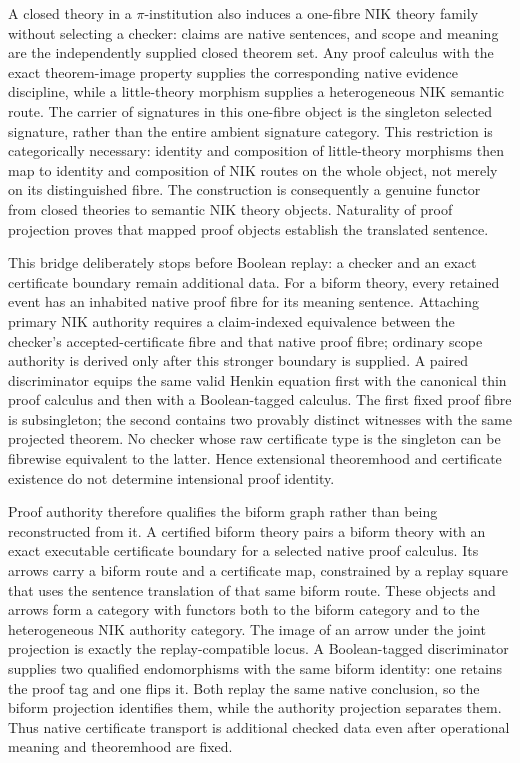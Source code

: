 \documentclass[11pt]{article}
\theoremstyle{definition}
\theoremstyle{remark}
\begin{document}
A closed theory in a $\pi$-institution also induces a one-fibre NIK theory
family without selecting a checker: claims are native sentences, and scope and
meaning are the independently supplied closed theorem set.  Any proof calculus
with the exact theorem-image property supplies the corresponding native
evidence discipline, while a little-theory morphism supplies a heterogeneous
NIK semantic route.  The carrier of signatures in this one-fibre object is the
singleton selected signature, rather than the entire ambient signature
category.  This restriction is categorically necessary: identity and
composition of little-theory morphisms then map to identity and composition of
NIK routes on the whole object, not merely on its distinguished fibre.  The
construction is consequently a genuine functor from closed theories to
semantic NIK theory objects.  Naturality of proof projection proves that mapped
proof objects establish the translated sentence.

This bridge deliberately stops before Boolean replay: a checker and an exact
certificate boundary remain additional data.  For a biform theory, every
retained event has an inhabited native proof fibre for its meaning sentence.
Attaching primary NIK authority requires a claim-indexed equivalence between
the checker's accepted-certificate fibre and that native proof fibre; ordinary
scope authority is derived only after this stronger boundary is supplied.  A
paired discriminator equips the same valid Henkin equation first with the
canonical thin proof calculus and then with a Boolean-tagged calculus.  The
first fixed proof fibre is subsingleton; the second contains two provably
distinct witnesses with the same projected theorem.  No checker whose raw
certificate type is the singleton can be fibrewise equivalent to the latter.
Hence extensional theoremhood and certificate existence do not determine
intensional proof identity.

Proof authority therefore qualifies the biform graph rather than being
reconstructed from it.  A certified biform theory pairs a biform theory
with an exact executable certificate boundary for a selected native proof
calculus.  Its arrows carry a biform route and a certificate map, constrained
by a replay square that uses the sentence translation of that same biform
route.  These objects and arrows form a category with functors both to the
biform category and to the heterogeneous NIK authority category.  The image of
an arrow under the joint projection is exactly the replay-compatible locus.
A Boolean-tagged discriminator supplies two qualified endomorphisms with the
same biform identity: one retains the proof tag and one flips it.  Both replay
the same native conclusion, so the biform projection identifies them, while
the authority projection separates them.  Thus native certificate transport
is additional checked data even after operational meaning and theoremhood are
fixed.
\end{document}
